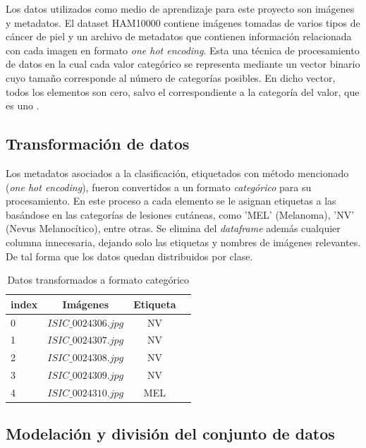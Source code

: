 Los datos utilizados como medio de aprendizaje para este proyecto son imágenes y metadatos. El dataset HAM10000 contiene imágenes tomadas de varios tipos de cáncer de piel y un archivo de metadatos que contienen información relacionada con cada imagen en formato \textit{one hot encoding}. Esta una técnica de procesamiento de datos en la cual cada valor categórico se representa mediante un vector binario cuyo tamaño corresponde al número de categorías posibles. En dicho vector, todos los elementos son cero, salvo el correspondiente a la categoría del valor, que es uno . 

\subsection{Transformación de datos}

Los metadatos asociados a la clasificación, etiquetados con método mencionado (\textit{one hot encoding}), fueron convertidos a un formato \textit{categórico}  para su procesamiento. En este proceso a cada elemento se le asignan etiquetas a las basándose en las categorías de lesiones cutáneas, como 'MEL' (Melanoma), 'NV' (Nevus Melanocítico), entre otras. Se elimina del \textit{dataframe} además cualquier columna innecesaria, dejando solo las etiquetas y nombres de imágenes relevantes. De tal forma que los datos quedan distribuidos por clase.

\begin{table}[ht]
   \centering
   \begin{tabular}{lccc}
   \hline
   \textbf{index} & \textbf{Imágenes} & \textbf{Etiqueta} \\
   \hline
      0 & $ISIC\_0024306.jpg$ & NV \\
      1 & $ISIC\_0024307.jpg$ & NV \\
      2 & $ISIC\_0024308.jpg$ & NV \\
      3 & $ISIC\_0024309.jpg$ & NV \\
      4 & $ISIC\_0024310.jpg$ & MEL \\
   \hline
   \end{tabular}
   \caption{Datos transformados a formato categórico}
   \label{}
\end{table}   

\subsection{Modelación y división del conjunto de datos}

